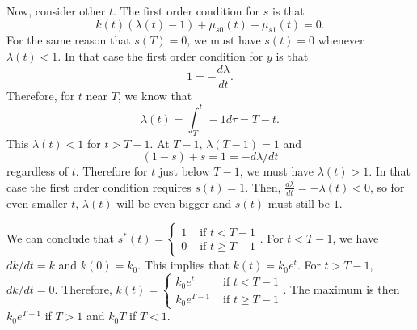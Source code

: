 \begin{example}
  Now, consider other $t$. The first order condition for $s$ is that
  \[ k(t)(\lambda(t) - 1) + \mu_{s0}(t) - \mu_{s1}(t) = 0. \]
  For the same reason that $s(T) = 0$, we must have $s(t) = 0$
  whenever $\lambda(t) < 1$. In that case the first order condition
  for $y$ is that 
  \[ 1 = -\frac{d\lambda}{dt}. \]
  Therefore, for $t$ near $T$, we know that
  \[ \lambda(t) = \int_T^t -1 d\tau = T - t. \]
  This $\lambda(t) < 1$ for $t > T-1$. At $T-1$, $\lambda(T-1) = 1$
  and 
  \[ (1-s) + s = 1 = -d\lambda/dt \]
  regardless of $t$. Therefore for $t$ just below $T-1$, we must have
  $\lambda(t)>1$. In that case the first order condition requires
  $s(t) = 1$. Then, $\frac{d\lambda}{dt} = -\lambda(t) < 0$, so for
  even smaller $t$, $\lambda(t)$ will be even bigger and $s(t)$ must
  still be $1$. 
  
  We can conclude that 
  $s^*(t) = \begin{cases} 1 & \text{ if } t 
    < T - 1 \\ 
    0 & \text{ if } t \geq T-1 \end{cases}$. For $t<T-1$, we have
  $dk/dt = k$ and $k(0) = k_0$. This implies that $k(t) = k_0
  e^t$. For $t>T-1$, $dk/dt = 0$. Therefore,
  $k(t) = \begin{cases} k_0 e^t & \text{ if } t<T-1 \\
   k_0 e^{T-1} & \text{ if } t \geq T-1 \end{cases}$. The maximum is then
  $k_0 e^{T-1}$ if $T>1$ and $k_0 T$ if $T<1$.   
\end{example}

